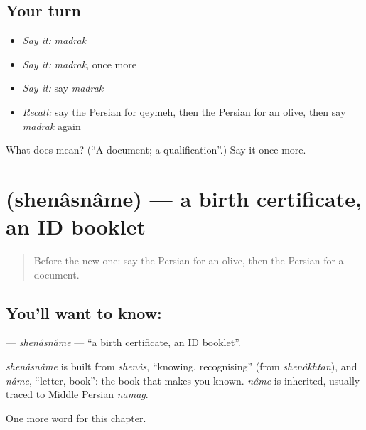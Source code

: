 \subsection*{Your turn}
\begin{itemize}
\raggedright
  \item \emph{Say it:} \emph{madrak}
  \item \emph{Say it:} \emph{madrak}, once more
  \item \emph{Say it:} say \emph{madrak}
  \item \emph{Recall:} say the Persian for qeymeh, then the Persian for an olive, then say \emph{madrak} again
\end{itemize}

\begin{tcolorbox}[breakable,colback=teal!4,colframe=teal!35!black,title={Before you move on}]
What does  mean? (\textquotedblleft{}A document; a qualification\textquotedblright{}.) Say it once more.
\end{tcolorbox}
\section[\texorpdfstring{\fa{شناسنامه} (shenâsnâme)}{شناسنامه (shenâsnâme)}]{ (shenâsnâme) — a birth certificate, an ID booklet}

\label{lesson:FA-C206-shenasname}



\begin{quote}
Before the new one: say the Persian for an olive, then the Persian for a document.
\end{quote}

\subsection*{You'll want to know: }
\textbf{} — \emph{shenâsnâme} — \textquotedblleft{}a birth certificate, an ID booklet\textquotedblright{}.

\begin{cousinweb}
\emph{shenâsnâme} is built from \emph{shenâs}, \textquotedblleft{}knowing, recognising\textquotedblright{} (from \emph{shenâkhtan}), and \emph{nâme}, \textquotedblleft{}letter, book\textquotedblright{}: the book that makes you known. \emph{nâme} is inherited, usually traced to Middle Persian \emph{nāmag}.
\end{cousinweb}

\begin{grammarlens}[title={What you've built}]
One more word for this chapter.
\end{grammarlens}

